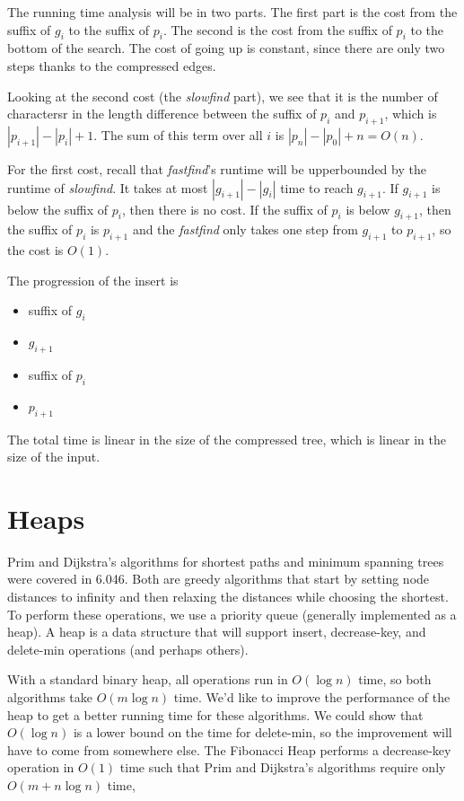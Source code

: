 \documentclass{article}
\begin{document}
The running time analysis will be in two parts.  The first part is the
cost from the suffix of $g_i$ to the suffix of $p_i$.  The second is the
cost from the suffix of $p_i$ to the bottom of the search.  The cost of
going up is constant, since there are only two steps thanks to the
compressed edges.

Looking at the second cost (the \emph{slowfind} part), we see that it is the
number of charactersr in the length difference between the suffix of
$p_i$ and $p_{i+1}$, which is $|p_{i+1}| - |p_i| + 1$.  The sum of this
term over all $i$ is $|p_n| - |p_0| + n = O(n)$.

For the first cost, recall that \emph{fastfind}'s runtime will be
upperbounded by the runtime of \emph{slowfind}.  It takes at most
$|g_{i+1}| - |g_i|$ time to reach $g_{i+1}$.  If $g_{i+1}$ is below the
suffix of $p_i$, then there is no cost.  If the suffix of $p_i$ is below
$g_{i+1}$, then the suffix of $p_i$ is $p_{i+1}$ and the
\emph{fastfind} only takes one step from $g_{i+1}$ to $p_{i+1}$, so
the cost is $O(1)$.

The progression of the insert is\\ \begin{itemize}
\item suffix of $g_i$ 
\item $g_{i+1}$ 
\item suffix of $p_i$ 
\item $p_{i+1}$
\end{itemize}

The total time is linear in the size of the compressed tree, which is
linear in the size of the input.


\section{Heaps}

Prim and Dijkstra's algorithms for shortest paths and minimum spanning
trees were covered in 6.046.  Both are greedy algorithms that start by
setting node distances to infinity and then relaxing the distances while
choosing the shortest.  To perform these operations, we use a priority
queue (generally implemented as a heap).  A heap is a data structure
that will support insert, decrease-key, and delete-min operations (and
perhaps others).

With a standard binary heap, all operations run in $O(\log n)$ time, so
both algorithms take $O(m \log n)$ time.  We'd like to improve the
performance of the heap to get a better running time for these
algorithms.  We could show that $O(\log n)$ is a lower bound on the time
for delete-min, so the improvement will have to come from somewhere
else.  The Fibonacci Heap performs a decrease-key operation in $O(1)$
time such that Prim and Dijkstra's algorithms require only $O(m + n \log
n)$ time,
\end{document}
